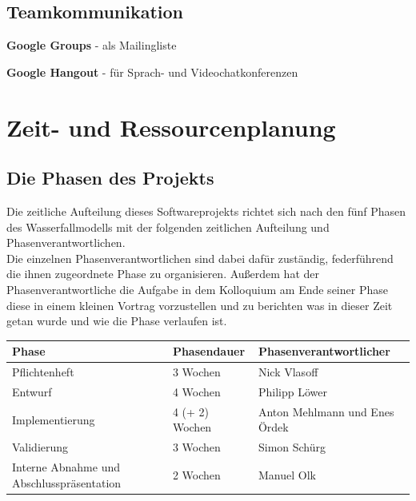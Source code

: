 \documentclass[10pt,a4paper]{article}
\begin{document}
\subsection{Teamkommunikation}
	\begin{list}{\quad}{}
		\item \textbf{Google Groups} - als Mailingliste
		\item \textbf{Google Hangout} - für Sprach- und Videochatkonferenzen
	\end{list}

\section{Zeit- und Ressourcenplanung}

\subsection{Die Phasen des Projekts}
Die zeitliche Aufteilung dieses Softwareprojekts richtet sich nach den fünf Phasen des Wasserfallmodells mit der folgenden zeitlichen Aufteilung und Phasenverantwortlichen.\\
Die einzelnen Phasenverantwortlichen sind dabei dafür zuständig, federführend die ihnen zugeordnete Phase zu organisieren. Außerdem hat der Phasenverantwortliche die Aufgabe in dem Kolloquium am Ende seiner Phase diese in einem kleinen Vortrag vorzustellen und zu berichten was in dieser Zeit getan wurde und wie die Phase verlaufen ist.\\

\begin{tabular}[h]{lll}
	\hline
	\textbf{Phase} & \textbf{Phasendauer} & \textbf{Phasenverantwortlicher} \\
	\hline
	Pflichtenheft & 3 Wochen & Nick Vlasoff \\
	Entwurf & 4 Wochen & Philipp Löwer \\
	Implementierung & 4 (+ 2) Wochen & Anton Mehlmann und Enes Ördek \\
	Validierung & 3 Wochen & Simon Schürg \\
	Interne Abnahme und Abschlusspräsentation & 2 Wochen & Manuel Olk \\
	\hline
\end{tabular}
\end{document}
